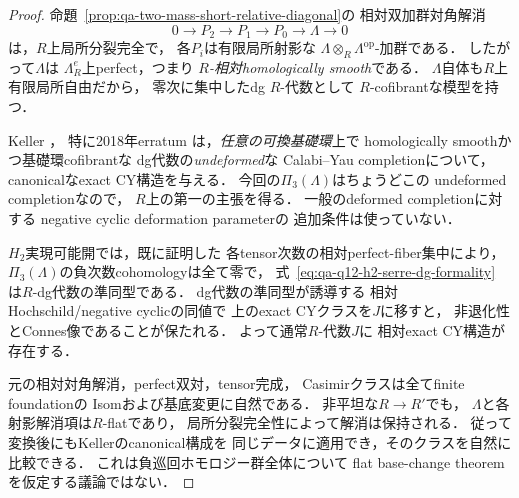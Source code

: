 \begin{proof}
命題~\ref{prop:qa-two-mass-short-relative-diagonal}の
相対双加群対角解消
\[
 0\longrightarrow P_2\longrightarrow P_1
   \longrightarrow P_0\longrightarrow\Lambda
   \longrightarrow0
\]
は，$R$上局所分裂完全で，
各$P_i$は有限局所射影な
$\Lambda\otimes_R\Lambda^{\mathrm{op}}$-加群である．
したがって$\Lambda$は
$\Lambda^e_R$上perfect，つまり
\emph{$R$-相対homologically smooth}である．
$\Lambda$自体も$R$上有限局所自由だから，
零次に集中したdg $R$-代数として
$R$-cofibrantな模型を持つ．

Keller \cite[Theorem~4.8]{KellerDeformedCY2011}，
特に2018年erratum
\cite[Theorem~1.1]{KellerErratumCY2018}
は，\emph{任意の可換基礎環}上で
homologically smoothかつ基礎環cofibrantな
dg代数の\emph{undeformed}な
Calabi--Yau completionについて，
canonicalなexact CY構造を与える．
今回の$\Pi_3(\Lambda)$はちょうどこの
undeformed completionなので，
$R$上の第一の主張を得る．
一般のdeformed completionに対する
negative cyclic deformation parameterの
追加条件は使っていない．

$H_2$実現可能開では，既に証明した
各tensor次数の相対perfect-fiber集中により，
$\Pi_3(\Lambda)$の負次数cohomologyは全て零で，
式~\eqref{eq:qa-q12-h2-serre-dg-formality}
は$R$-dg代数の準同型である．
dg代数の準同型が誘導する
相対Hochschild/negative cyclicの同値で
上のexact CYクラスを$J$に移すと，
非退化性とConnes像であることが保たれる．
よって通常$R$-代数$J$に
相対exact CY構造が存在する．

元の相対対角解消，perfect双対，tensor完成，
Casimirクラスは全てfinite foundationの
Isomおよび基底変更に自然である．
非平坦な$R\to R'$でも，
$\Lambda$と各射影解消項は$R$-flatであり，
局所分裂完全性によって解消は保持される．
従って変換後にもKellerのcanonical構成を
同じデータに適用でき，そのクラスを自然に比較できる．
これは負巡回ホモロジー群全体について
flat base-change theoremを仮定する議論ではない．
\end{proof}

